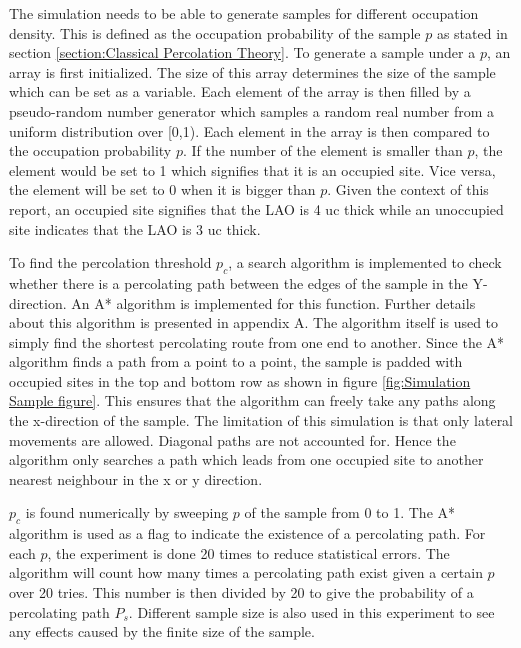 \documentclass[11pt,a4paper]{report}
\begin{document}
The simulation needs to be able to generate samples for different occupation density. This is defined as the occupation probability of the sample $p$ as stated in section \ref{section:Classical Percolation Theory}. To generate a sample under a $p$, an array is first initialized. The size of this array determines the size of the sample which can be set as a variable. Each element of the array is then filled by a pseudo-random number generator which samples a random real number from a uniform distribution over [0,1). Each element in the array is then compared to the occupation probability $p$. If the number of the element is smaller than $p$, the element would be set to 1 which signifies that it is an occupied site. Vice versa, the element will be set to 0 when it is bigger than $p$. Given the context of this report, an occupied site signifies that the LAO is 4 uc thick while an unoccupied site indicates that the LAO is 3 uc thick. 

To find the percolation threshold $p_c$, a search algorithm is implemented to check whether there is a percolating path between the edges of the sample in the Y-direction. An A* algorithm is implemented for this function. Further details about this algorithm is presented in appendix A. The algorithm itself is used to simply find the shortest percolating route from one end to another. Since the A* algorithm finds a path from a point to a point, the sample is padded with occupied sites in the top and bottom row as shown in figure \ref{fig:Simulation Sample figure}. This ensures that the algorithm can freely take any paths along the x-direction of the sample. The limitation of this simulation is that only lateral movements are allowed. Diagonal paths are not accounted for. Hence the algorithm only searches a path which leads from one occupied site to another nearest neighbour in the x or y direction.

$p_c$ is found numerically by sweeping $p$ of the sample from 0 to 1. The A* algorithm is used as a flag to indicate the existence of a percolating path. For each $p$, the experiment is done 20 times to reduce statistical errors. The algorithm will count how many times a percolating path exist given a certain $p$ over 20 tries. This number is then divided by 20 to give the probability of a percolating path $P_s$. Different sample size is also used in this experiment to see any effects caused by the finite size of the sample.
\end{document}
